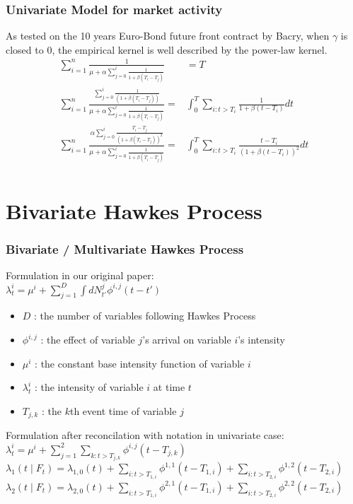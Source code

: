 \documentclass{beamer}
\begin{document}
\begin{frame}
\frametitle{Univariate Model for market activity}
As tested on the 10 years Euro-Bond future front contract by Bacry, when $\gamma$ is closed to $0$, the empirical kernel is well described by the power-law kernel.
\begin{equation*}
\begin{split}
\sum_{i=1}^n \frac{1}{\mu + \alpha\sum_{j=0}^i \frac{1}{1 + \beta (T_i - T_j)}} &= T\\
\sum_{i=1}^n \frac{\sum_{j=0}^i \frac{1}{(1 + \beta (T_i - T_j))}}{\mu + \alpha\sum_{j=0}^i \frac{1}{1 + \beta (T_i - T_j)}} = &\int_{0}^{T} \sum_{i: t>T_i} \frac{1}{1 + \beta (t - T_i)} dt\\
\sum_{i=1}^n \frac{\alpha\sum_{j=0}^i \frac{T_i - T_j}{(1 + \beta (T_i - T_j))^2}}{\mu + \alpha\sum_{j=0}^i \frac{1}{1 + \beta (T_i - T_j)}} = &\int_{0}^{T} \sum_{i: t>T_i} \frac{t - T_i}{(1 + \beta (t - T_i))^2} dt\\
\end{split}
\end{equation*}
\end{frame}

\section{Bivariate Hawkes Process}

\begin{frame}
\frametitle{Bivariate / Multivariate Hawkes Process}
Formulation in our original paper:\\
$\lambda_t^i = \mu^i + \sum_{j=1}^D \int dN_{t'}^j \phi^{i,j} (t - t')$\\
\begin{itemize}
	\item $D$ : the number of variables following Hawkes Process
	\item $\phi^{i,j}$ : the effect of variable $j$'s arrival on variable $i$'s intensity
	\item $\mu^i$ : the constant base intensity function of variable $i$
	\item $\lambda_t^i$ : the intensity of variable $i$ at time $t$
	\item $T_{j,k}$ : the $k$th event time of variable $j$
\end{itemize}
Formulation after reconcilation with notation in univariate case:\\
$\lambda_t^i = \mu^i + \sum_{j=1}^2 \sum_{k: t > T_{j,k}} \phi^{i,j}(t - T_{j,k})$\\	
$\lambda_1(t \mid F_t) = \lambda_{1,0}(t) + \sum_{i: t > T_{1,i}} \phi^{1,1}(t - T_{1,i}) + \sum_{i: t > T_{2,i}} \phi^{1,2}(t - T_{2,i})$\\
$\lambda_2(t \mid F_t) = \lambda_{2,0}(t) + \sum_{i: t > T_{1,i}} \phi^{2,1}(t - T_{1,i}) + \sum_{i: t > T_{2,i}} \phi^{2,2}(t - T_{2,i})$
\end{frame}
\end{document}
